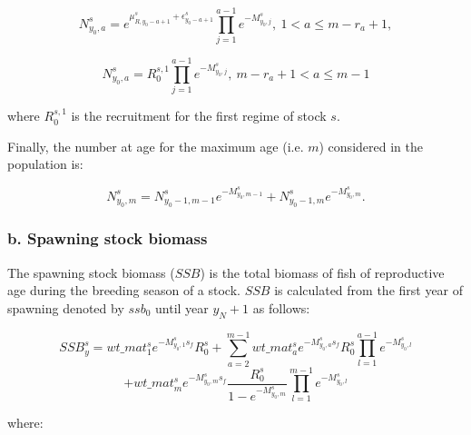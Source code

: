 \documentclass{article}
\begin{document}
\begin{equation}
N^s_{y_0,a}=e^{\mu_{R,y_0-a+1}^s + \epsilon^s_{y_0-a+1}}                          \prod_{j=1}^{a-1}e^{-M^s_{y_0,j}}, \ 1<a\leq m-r_a+1,
\end{equation}

\begin{equation}
N^s_{y_0,a}=R_0^{s,1}\prod_{j=1}^{a-1}e^{-M^s_{y_0,j}}, \ m-r_a+1<a\leq m-1
\end{equation}

where $R_0^{s,1}$ is the recruitment for the first regime of stock $s$.

Finally, the number at age for the maximum age (i.e. $m$) considered in the population is:

\begin{equation}
N^s_{y_0,m}=N^s_{y_0-1,m-1}e^{-M^s_{y_0,m-1}}+N^s_{y_0-1,m}e^{-M^s_{y_0,m}}.
\end{equation}

\hfill

\hfill

\subsubsection{b. Spawning stock biomass} \label{ssb}

The spawning stock biomass ($SSB$) is the total biomass of fish of reproductive age during the breeding season of a stock. $SSB$ is calculated from the first year of spawning denoted by $ssb_0$ until year $y_N+1$ as follows:

\begin{equation}
    SSB^s_y=wt\_{mat}^s_1 e^{-M^s_{y_0,1}s_f} R^s_0 +  
            \sum_{a=2}^{m-1}wt\_{mat}^s_a e^{-M^s_{y_0,a}s_f} R^s_0\prod_{l=1}^{a-1}e^{-M^s_{y_0,l}} 
\end{equation}
\begin{equation*}
    + 
            {wt\_mat}^s_{m} e^{-M^s_{y_0,m}s_f} \dfrac{R^s_0}{1-e^{-M^s_{y_0,m}}}\prod_{l=1}^{m-1}e^{-M^s_{y_0,l}}
\end{equation*}
  
where:
\end{document}
